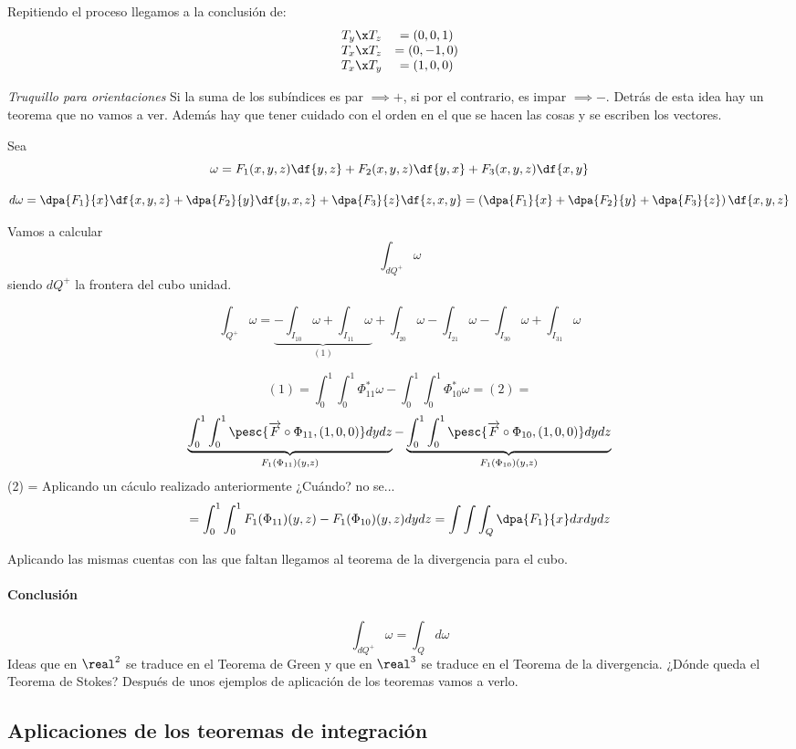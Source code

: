 Repitiendo el proceso llegamos a la conclusión de: \[
\begin{array}{cc}
T_y\x T_z &= (0,0,1)\\
T_x\x T_z &= (0,-1,0)\\
T_x\x T_y &= (1,0,0)
\end{array}\]

\textit{Truquillo para orientaciones} Si la suma de los subíndices es par $\implies +$, si por el contrario, es impar $\implies -$. Detrás de esta idea hay un teorema que no vamos a ver. Además hay que tener cuidado con el orden en el que se hacen las cosas y se escriben los vectores.

Sea
\[\omega = F_1(x,y,z)\df{y,z}+F_2(x,y,z)\df{y,x}+F_3(x,y,z)\df{x,y}\]
 
\[d\omega = \dpa{F_1}{x}\df{x,y,z} + \dpa{F_2}{y}\df{y,x,z} + \dpa{F_3}{z}\df{z,x,y} = \left(\dpa{F_1}{x}+\dpa{F_2}{y} + \dpa{F_3}{z}\right) \df{x,y,z}
\]

Vamos a calcular \[\int_{dQ^+} \omega\] siendo $dQ^+$ la frontera del cubo unidad.

\[\int_{Q^+} \omega =\underbrace{ -\int_{I_{10}} \omega +  \int_{I_{11}} \omega}_{(1)} + \int_{I_{20}} \omega -  \int_{I_{21}} \omega  -\int_{I_{30}} \omega +  \int_{I_{31}} \omega\]

\[
(1) = \int_0^1\int_0^1\Phi^{\ast}_{11}\omega - \int_0^1\int_0^1 \Phi^{\ast}_{10} \omega = (2) =\]
\[
 \underbrace{\int_0^1\int_0^1 \pesc{\overrightarrow{F}\circ \Phi_{11},(1,0,0)}dydz}_{F_1(\Phi_{11})(y,z)}
 - \underbrace{ \int_0^1\int_0^1 \pesc{\overrightarrow{F}\circ \Phi_{10},(1,0,0)}dydz}_{F_1(\Phi_{10})(y,z)}
\]
(2) = Aplicando un cáculo realizado anteriormente ¿Cuándo? no se...
\[
= \int_0^1\int_0^1 F_1(\Phi_{11})(y,z)-F_1(\Phi_{10})(y,z)dydz = \int\int\int_Q \dpa{F_1}{x}dxdydz
\]

Aplicando las mismas cuentas con las que faltan llegamos al teorema de la divergencia para el cubo.


\paragraph{Conclusión}
\[\int_{dQ^+} \omega = \int_{Q}d\omega\]
Ideas que en $\real^2$ se traduce en el Teorema de Green y que en $\real^3$ se traduce en el Teorema de la divergencia. ¿Dónde queda el Teorema de Stokes? Después de unos ejemplos de aplicación de los teoremas vamos a verlo.


\subsection{Aplicaciones de los teoremas de integración}
